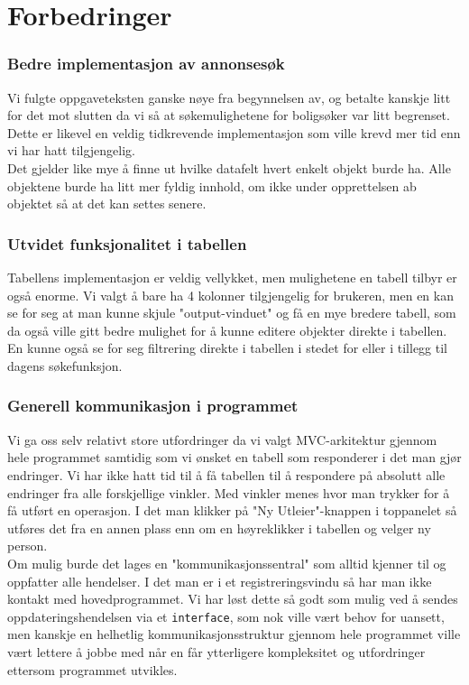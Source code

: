 \section{Forbedringer}

\subsubsection{Bedre implementasjon av annonsesøk}
Vi fulgte oppgaveteksten ganske nøye fra begynnelsen av, og betalte kanskje litt for det mot slutten da vi så at søkemulighetene for boligsøker var litt begrenset.
Dette er likevel en veldig tidkrevende implementasjon som ville krevd mer tid enn vi har hatt tilgjengelig. \\
Det gjelder like mye å finne ut hvilke datafelt hvert enkelt objekt burde ha. Alle objektene burde ha litt mer fyldig innhold, om ikke under opprettelsen ab objektet så at det kan settes senere.

\subsubsection{Utvidet funksjonalitet i tabellen}
Tabellens implementasjon er veldig vellykket, men mulighetene en tabell tilbyr er også enorme. Vi valgt å bare ha 4 kolonner tilgjengelig for brukeren, men en kan se for seg at man kunne skjule "output-vinduet" og få en mye bredere tabell, som da også ville gitt bedre mulighet for å kunne editere objekter direkte i tabellen. \\
En kunne også se for seg filtrering direkte i tabellen i stedet for eller i tillegg til dagens søkefunksjon.

\subsubsection{Generell kommunikasjon i programmet}
Vi ga oss selv relativt store utfordringer da vi valgt MVC-arkitektur gjennom hele programmet samtidig som vi ønsket en tabell som responderer i det man gjør endringer. Vi har ikke hatt tid til å få tabellen til å respondere på absolutt alle endringer fra alle forskjellige vinkler. Med vinkler menes hvor man trykker for å få utført en operasjon. I det man klikker på "Ny Utleier"-knappen i toppanelet så utføres det fra en annen plass enn om en høyreklikker i tabellen og velger ny person. \\
Om mulig burde det lages en "kommunikasjonssentral" som alltid kjenner til og oppfatter alle hendelser. I det man er i et registreringsvindu så har man ikke kontakt med hovedprogrammet. Vi har løst dette så godt som mulig ved å sendes oppdateringshendelsen via et \texttt{interface}, som nok ville vært behov for uansett, men kanskje en helhetlig kommunikasjonsstruktur gjennom hele programmet ville vært lettere å jobbe med når en får ytterligere kompleksitet og utfordringer ettersom programmet utvikles. \\

